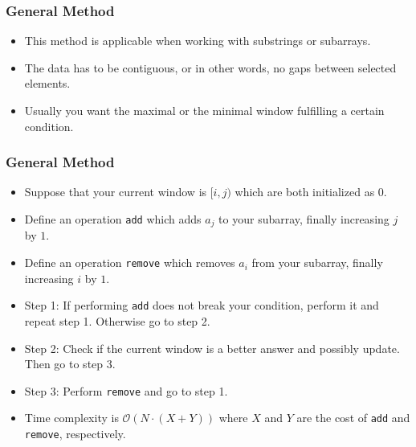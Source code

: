 \documentclass[10pt]{beamer}
\begin{document}
\begin{frame}
    \frametitle{General Method}
    \begin{itemize}
        \item<1->  This method is applicable when working with substrings or subarrays.
        \item<2->  The data has to be contiguous, or in other words, no gaps between selected elements.
        \item<3->  Usually you want the maximal or the minimal window fulfilling a certain condition.
    \end{itemize}
\end{frame}

\begin{frame}
    \frametitle{General Method}
    \begin{itemize}
        \item<1->  Suppose that your current window is $[i, j)$ which are both initialized as $0$.
        \item<2->  Define an operation \texttt{add} which adds $a_j$ to your subarray, finally increasing $j$ by $1$.
        \item<3->  Define an operation \texttt{remove} which removes $a_i$ from your subarray, finally increasing $i$ by $1$.
        \item<4->  Step 1: If performing \texttt{add} does not break your condition, perform it and repeat step 1. Otherwise go to step 2.
        \item<5->  Step 2: Check if the current window is a better answer and possibly update. Then go to step 3.
        \item<6->  Step 3: Perform \texttt{remove} and go to step 1.
        \item<7-> Time complexity is $\mathcal{O}(N \cdot (X + Y))$ where $X$ and $Y$ are the cost of \texttt{add} and \texttt{remove}, respectively.
    \end{itemize}
\end{frame}
\end{document}
